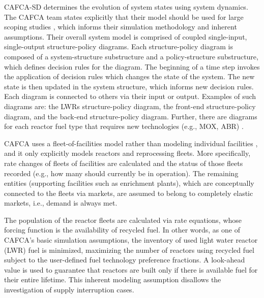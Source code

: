 CAFCA-SD determines the evolution of system states using system dynamics. The
CAFCA team states explicitly that their model should be used for large scoping
studies \cite{guerin_impact_2009}, which informs their simulation methodology
and inherent assumptions. Their overall system model is comprised of coupled
single-input, single-output structure-policy diagrams. Each structure-policy
diagram is composed of a system-structure substructure and a policy-structure
substructure, which defines decision rules for the diagram. The beginning of a
time step invokes the application of decision rules which changes the state of
the system. The new state is then updated in the system structure, which informs
new decision rules. Each diagram is connected to others via their input or
output. Examples of such diagrams are: the LWRs structure-policy diagram, the
front-end structure-policy diagram, and the back-end structure-policy
diagram. Further, there are diagrams for each reactor fuel type that requires
new technologies (e.g., MOX,
ABR) \cite{busquim_e_silva_system_2008,guerin_impact_2009}.

CAFCA uses a fleet-of-facilities model rather than modeling individual
facilities \cite{guerin_impact_2009}, and it only explicitly models reactors and
reprocessing fleets. More specifically, rate changes of fleets of facilities are
calculated and the status of those fleets recorded (e.g., how many should
currently be in operation). The remaining entities (supporting facilities such
as enrichment plants), which are conceptually connected to the fleets via
markets, are assumed to belong to completely elastic markets, i.e., demand is
always met. 

The population of the reactor fleets are calculated via rate equations, whose
forcing function is the availability of recycled fuel. In other words, as one of
CAFCA's basic simulation assumptions, the inventory of used light water reactor
(LWR) fuel is minimized, maximizing the number of reactors using recycled fuel
subject to the user-defined fuel technology preference fractions. A look-ahead
value is used to guarantee that reactors are built only if there is available
fuel for their entire lifetime. This inherent modeling assumption disallows
the investigation of supply interruption cases.

